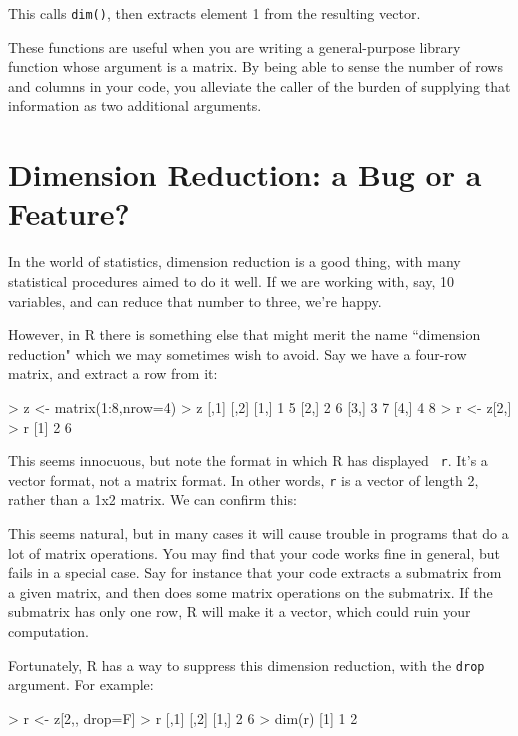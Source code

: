 \noindent
This calls {\tt dim()}, then extracts element 1 from the resulting
vector.

These functions are useful when you are writing a general-purpose
library function whose argument is a matrix.  By being able to sense the
number of rows and columns in your code, you alleviate the caller of the
burden of supplying that information as two additional arguments.

\section{Dimension Reduction:  a Bug or a Feature?}
\label{feature}

In the world of statistics, dimension reduction is a good thing, with
many statistical procedures aimed to do it well.  If we are working
with, say, 10 variables, and can reduce that number to three, we're
happy.

However, in R there is something else that might merit the name
``dimension reduction" which we may sometimes wish to avoid.  Say we
have a four-row matrix, and extract a row from it:

\begin{Code}
> z <- matrix(1:8,nrow=4)
> z
     [,1] [,2]
[1,]    1    5
[2,]    2    6
[3,]    3    7
[4,]    4    8
> r <- z[2,]
> r
[1] 2 6
\end{Code}

This seems innocuous, but note the format in which R has displayed {\tt
r}.  It's a vector format, not a matrix format.  In other words, {\tt r}
is a vector of length 2, rather than a 1x2 matrix.  We can confirm this:


This seems natural, but in many cases it will cause trouble in programs
that do a lot of matrix operations.  You may find that your code works
fine in general, but fails in a special case.  Say for instance that
your code extracts a submatrix from a given matrix, and then does some
matrix operations on the submatrix.  If the submatrix has only one row,
R will make it a vector, which could ruin your computation.

Fortunately, R has a way to suppress this dimension reduction, with the
{\tt drop} argument.  For example:

\begin{Code}
> r <- z[2,, drop=F]
> r
     [,1] [,2]
[1,]    2    6
> dim(r)
[1] 1 2
\end{Code}


